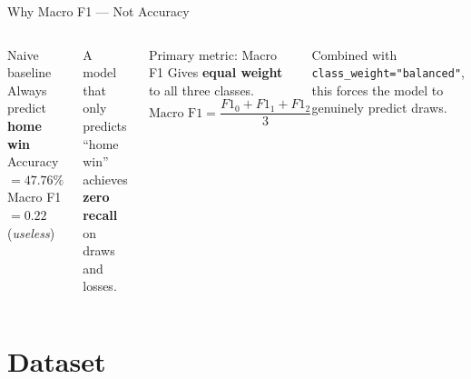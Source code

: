 \documentclass[10pt,aspectratio=169]{beamer}
\begin{document}
\begin{frame}{Why Macro F1 --- Not Accuracy}
  \begin{columns}[T]
      \begin{block}{Naive baseline}
        Always predict \textbf{home win} \\[4pt]
        \quad Accuracy $= 47.76\%$ \\
        \quad Macro F1 $= 0.22$ \quad (\textit{useless})
      \end{block}
      \medskip
      A model that only predicts ``home win'' achieves \textbf{zero recall}
      on draws and losses.

      \begin{block}{Primary metric: Macro F1}
        Gives \textbf{equal weight} to all three classes.\\[4pt]
        \[
          \text{Macro F1} = \frac{F1_0 + F1_1 + F1_2}{3}
        \]
      \end{block}
      \medskip
      Combined with \texttt{class\_weight="balanced"}, this forces
      the model to genuinely predict draws.
  \end{columns}
\end{frame}

\section{Dataset}
\end{document}
